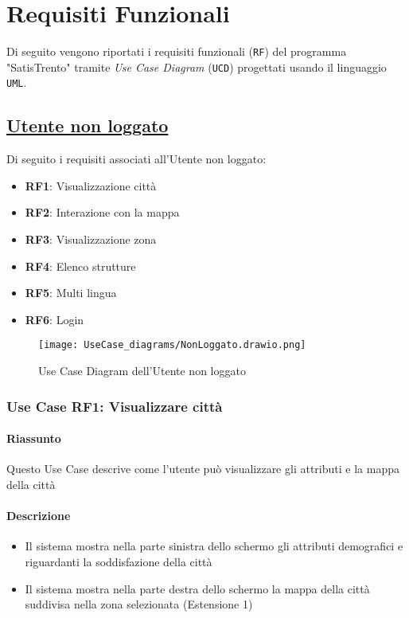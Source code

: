 \chapter{Requisiti Funzionali}
\label{ch:requisitiFunzionali}

Di seguito vengono riportati i requisiti funzionali (\texttt{RF}) del programma "SatisTrento" tramite \textit{Use Case Diagram} (\texttt{UCD}) progettati usando il linguaggio \texttt{UML}.

\section{\underline{Utente non loggato}}
    Di seguito i requisiti associati all'Utente non loggato:
    \begin{itemize}
        \item \textbf{RF1}: Visualizzazione città
        \item \textbf{RF2}: Interazione con la mappa
        \item \textbf{RF3}: Visualizzazione zona
        \item \textbf{RF4}: Elenco strutture
        \item \textbf{RF5}: Multi lingua
        \item \textbf{RF6}: Login
    \end{itemize}
    \begin{figure}[H]
        \centering
        \texttt{[image: UseCase\_diagrams/NonLoggato.drawio.png]}
        \caption{Use Case Diagram dell'Utente non loggato}
    \end{figure}

    \subsection{Use Case RF1: Visualizzare città}
        \subsubsection{Riassunto}
            Questo Use Case descrive come l'utente può visualizzare gli attributi e la mappa della città
        \subsubsection{Descrizione}
            \begin{itemize}
                \item Il sistema mostra nella parte sinistra dello schermo gli attributi demografici e riguardanti la soddisfazione della città
                \item Il sistema mostra nella parte destra dello schermo la mappa della città suddivisa nella zona selezionata (Estensione 1)
            \end{itemize}
